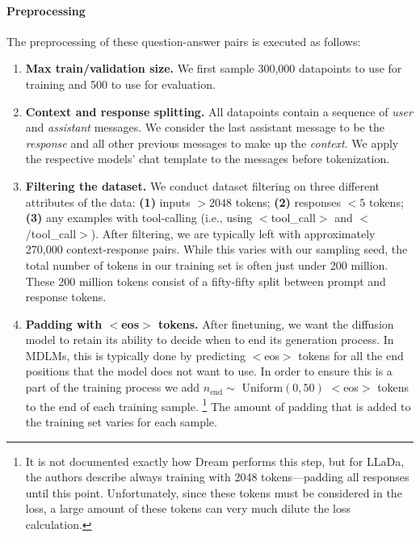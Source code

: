 \documentclass{article}
\begin{document}
\paragraph{Preprocessing} The preprocessing of these question-answer pairs is executed as follows:
\begin{enumerate}
    \item \textbf{Max train/validation size.} We first sample 300,000 datapoints to use for training and 500 to use for evaluation. 
    
    \item \textbf{Context and response splitting.} All datapoints contain a sequence of \emph{user} and \emph{assistant} messages. We consider the last assistant message to be the \emph{response} and all other previous messages to make up the \emph{context}. We apply the respective models' chat template to the messages before tokenization.

    \item \textbf{Filtering the dataset.} We conduct dataset filtering on three different attributes of the data: \textbf{(1)} inputs $> 2048$ tokens; \textbf{(2)} responses $< 5$ tokens; \textbf{(3)} any examples with tool-calling (i.e., using $<$tool\_call$>$ and $<$/tool\_call$>$). 
    After filtering, we are typically left with approximately 270,000 context-response pairs. 
    While this varies with our sampling seed, the total number of tokens in our training set is often just under 200 million.
    These 200 million tokens consist of a fifty-fifty split between prompt and response tokens.
    
    \item \textbf{Padding with $<$eos$>$ tokens.} 
    After finetuning, we want the diffusion model to retain its ability to decide when to end its generation process. 
    In MDLMs, this is typically done by predicting $<$eos$>$ tokens for all the end positions that the model does not want to use. 
    In order to ensure this is a part of the training process we add $n_\text{end} \sim$ Uniform$(0,50)$ $<$eos$>$ tokens to the end of each training sample.
    \footnote{It is not documented exactly how Dream performs this step, but for LLaDa, the authors describe always training with 2048 tokens---padding all responses until this point. Unfortunately, since these tokens must be considered in the loss, a large amount of these tokens can very much dilute the loss calculation.}
    The amount of padding that is added to the training set varies for each sample. 


\end{enumerate}
\end{document}
